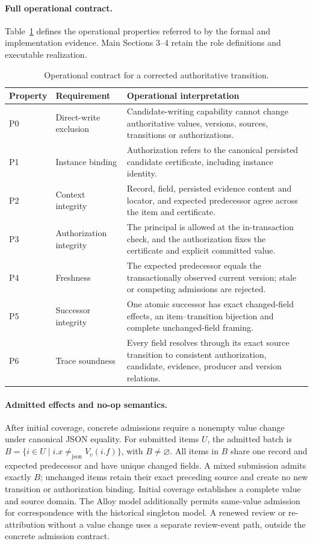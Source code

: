 \documentclass[11pt,a4paper]{article}
\newcommand{\neqc}{\mathrel{\neq_{\mathrm{json}}}}
\begin{document}
\paragraph{Full operational contract.}
Table~\ref{tab:s-contract} defines the operational properties referred to by the formal and implementation evidence. Main Sections 3--4 retain the role definitions and executable realization.
\begin{table}[htbp]
\centering\small
\caption{Operational contract for a corrected authoritative transition.}
\label{tab:s-contract}
\begin{tabularx}{\textwidth}{@{}l>{\raggedright\arraybackslash}p{}X@{}}
\toprule
Property & Requirement & Operational interpretation \\
\midrule
P0 & Direct-write exclusion & Candidate-writing capability cannot change authoritative values, versions, sources, transitions or authorizations. \\
P1 & Instance binding & Authorization refers to the canonical persisted candidate certificate, including instance identity. \\
P2 & Context integrity & Record, field, persisted evidence content and locator, and expected predecessor agree across the item and certificate. \\
P3 & Authorization integrity & The principal is allowed at the in-transaction check, and the authorization fixes the certificate and explicit committed value. \\
P4 & Freshness & The expected predecessor equals the transactionally observed current version; stale or competing admissions are rejected. \\
P5 & Successor integrity & One atomic successor has exact changed-field effects, an item--transition bijection and complete unchanged-field framing. \\
P6 & Trace soundness & Every field resolves through its exact source transition to consistent authorization, candidate, evidence, producer and version relations. \\
\bottomrule
\end{tabularx}
\end{table}

\paragraph{Admitted effects and no-op semantics.}
After initial coverage, concrete admissions require a nonempty value change under canonical JSON equality. For submitted items $U$, the admitted batch is $B=\{i\in U\mid i.x\neqc V_v(i.f)\}$, with $B\ne\varnothing$. All items in $B$ share one record and expected predecessor and have unique changed fields. A mixed submission admits exactly $B$; unchanged items retain their exact preceding source and create no new transition or authorization binding. Initial coverage establishes a complete value and source domain. The Alloy model additionally permits same-value admission for correspondence with the historical singleton model. A renewed review or re-attribution without a value change uses a separate review-event path, outside the concrete admission contract.
\end{document}
